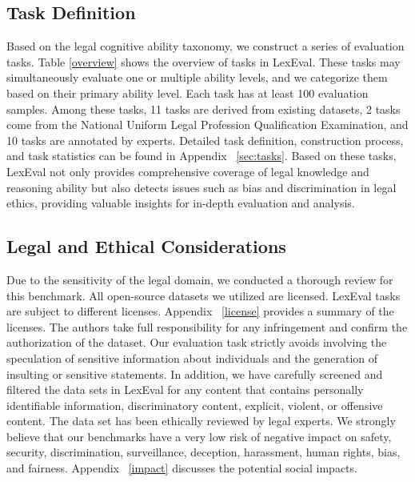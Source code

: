\subsection{Task Definition}
Based on the legal cognitive ability taxonomy, we construct a series of evaluation tasks. Table \ref{overview} shows the overview of tasks in LexEval.
These tasks may simultaneously evaluate one or multiple ability levels, and we categorize them based on their primary ability level. Each task has at least 100 evaluation samples. Among these tasks, 11 tasks are derived from existing datasets, 2 tasks come from the National Uniform Legal Profession Qualification Examination, and 10 tasks are annotated by experts. Detailed task definition, construction process, and task statistics can be found in Appendix ~\ref{sec:tasks}. Based on these tasks, LexEval not only provides comprehensive coverage of legal knowledge and reasoning ability but also detects issues such as bias and discrimination in legal ethics, providing valuable insights for in-depth evaluation and analysis.

\subsection{Legal and Ethical Considerations}
\label{ethical}
Due to the sensitivity of the legal domain, we conducted a thorough review for this benchmark. All open-source datasets we utilized are licensed. LexEval tasks are subject to different licenses. Appendix ~\ref{license}  provides a summary of the licenses. The authors take full responsibility for any infringement and confirm the authorization of the dataset.
Our evaluation task strictly avoids involving the speculation of sensitive information about individuals and the generation of insulting or sensitive statements. 
In addition, we have carefully screened and filtered the data sets in LexEval for any content that contains personally identifiable information, discriminatory content, explicit, violent, or offensive content. The data set has been ethically reviewed by legal experts. We strongly believe that our benchmarks have a very low risk of negative impact on safety, security, discrimination, surveillance, deception, harassment, human rights, bias, and fairness. Appendix ~\ref{impact} discusses the potential social impacts.

